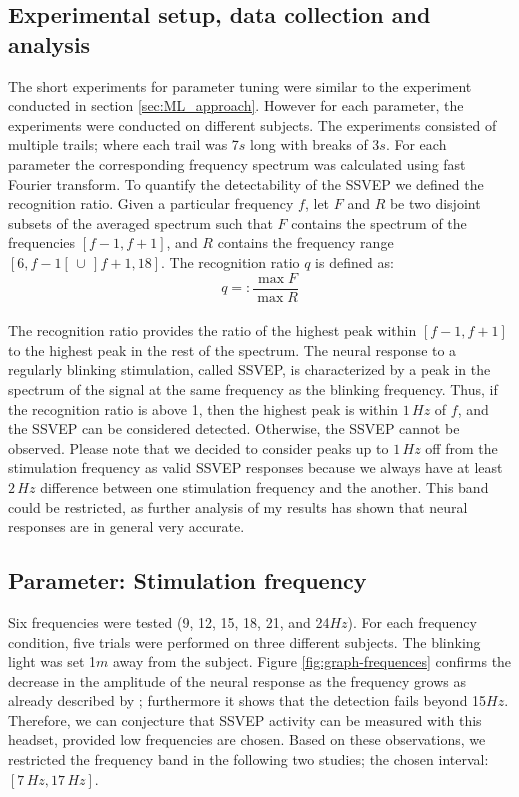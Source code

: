 \documentclass{svmult}
\begin{document}
\subsection{Experimental setup, data collection and analysis}
The short experiments for parameter tuning were similar to the experiment conducted in section \ref{sec:ML_approach}. However for each parameter, the experiments were conducted on different subjects. The experiments consisted of multiple trails; where each trail was 7$s$ long with breaks of 3$s$. For each parameter the corresponding frequency spectrum was calculated using fast Fourier transform. To quantify the detectability of the SSVEP we defined the recognition ratio. Given a particular frequency $f$, let $F$ and $R$ be two disjoint subsets of the averaged spectrum such that $F$ contains the spectrum of the frequencies $[f-1, f+1]$, and $R$ contains the frequency range $[6, f-1[ \,\cup\, ]f+1, 18]$. The recognition ratio $q$ is defined as:
\begin{equation}
\label{recog_rat}
q =:\frac{\max F}{\max R}
\end{equation}
\\
The recognition ratio provides the ratio of the highest peak within $[f-1, f+1]$ to the highest peak in the rest of the spectrum. The neural response to a regularly blinking stimulation, called SSVEP, is characterized by a peak in the spectrum of the signal at the same frequency as the blinking frequency. Thus, if the recognition ratio is above 1, then the highest peak is within $1\,\mathit{Hz}$ of $f$, and the SSVEP can be considered detected. Otherwise, the SSVEP cannot be observed. Please note that we decided to consider peaks up to $1\,\mathit{Hz}$ off from the stimulation frequency as valid SSVEP responses because we always have at least $2\,\mathit{Hz}$ difference between one stimulation frequency and the another. This band could be restricted, as further analysis of my results has shown that neural responses are in general very accurate.

\subsection{Parameter: Stimulation frequency}
Six frequencies were tested (9, 12, 15, 18, 21, and 24$Hz$). For each frequency condition, five trials were performed on three different subjects. The blinking light was set 1$m$ away from the subject. Figure \ref{fig:graph-frequences} confirms the decrease in the amplitude of the neural response as the frequency grows as already described by \cite{herrmann2001}; furthermore it shows that the detection fails beyond 15$Hz$. Therefore, we can conjecture that SSVEP activity can be measured with this headset, provided low frequencies are chosen. Based on these observations, we restricted the frequency band in the following two studies; the chosen interval: $[7\,\mathit{Hz}, 17\,\mathit{Hz}]$.
\end{document}
